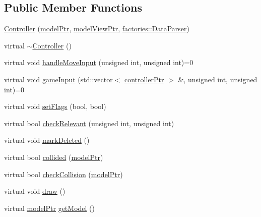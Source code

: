 \subsection*{\-Public \-Member \-Functions}
\begin{DoxyCompactItemize}
\item 
\hyperlink{classcontrollers_1_1Controller_a3c74d4726b4e635f261d4dafa5c7807f}{\-Controller} (\hyperlink{ModelView_8h_a78966ddb517fca8d2b29a2bc5c31e74e}{model\-Ptr}, \hyperlink{Controller_8h_a8ca0a41a38eb52be242997413482c0cf}{model\-View\-Ptr}, \hyperlink{classfactories_1_1DataParser}{factories\-::\-Data\-Parser})
\item 
virtual \hyperlink{classcontrollers_1_1Controller_a26a8767e0333b5dd5fa023cb5f624182}{$\sim$\-Controller} ()
\item 
virtual void \hyperlink{classcontrollers_1_1Controller_ae4eb0768c65456a1ffe84260c5713013}{handle\-Move\-Input} (unsigned int, unsigned int)=0
\item 
virtual void \hyperlink{classcontrollers_1_1Controller_af489be7993b237aeb54e2d9974db0e04}{game\-Input} (std\-::vector$<$ \hyperlink{namespacecontrollers_ab74cf2ed38c0b0460698b4eb6fe8bec5}{controller\-Ptr} $>$ \&, unsigned int, unsigned int)=0
\item 
virtual void \hyperlink{classcontrollers_1_1Controller_af4b5bfdadbaaf98fe010d9381dca4e7a}{set\-Flags} (bool, bool)
\item 
virtual bool \hyperlink{classcontrollers_1_1Controller_ae261028f5b18e70194e534240fd0ef76}{check\-Relevant} (unsigned int, unsigned int)
\item 
virtual void \hyperlink{classcontrollers_1_1Controller_a6136bf7657dc0c6716392388069085d8}{mark\-Deleted} ()
\item 
virtual bool \hyperlink{classcontrollers_1_1Controller_a4d2a32746f2dd3a7388a731733c329dd}{collided} (\hyperlink{ModelView_8h_a78966ddb517fca8d2b29a2bc5c31e74e}{model\-Ptr})
\item 
virtual bool \hyperlink{classcontrollers_1_1Controller_a4ff3575d684812eaa52371ee67c1d4c8}{check\-Collision} (\hyperlink{ModelView_8h_a78966ddb517fca8d2b29a2bc5c31e74e}{model\-Ptr})
\item 
virtual void \hyperlink{classcontrollers_1_1Controller_a8e28c0be4a528c8cdc4800ac6e377248}{draw} ()
\item 
virtual \hyperlink{ModelView_8h_a78966ddb517fca8d2b29a2bc5c31e74e}{model\-Ptr} \hyperlink{classcontrollers_1_1Controller_a011e62186a007b883fd1ffabd5f8755e}{get\-Model} ()
\end{DoxyCompactItemize}
